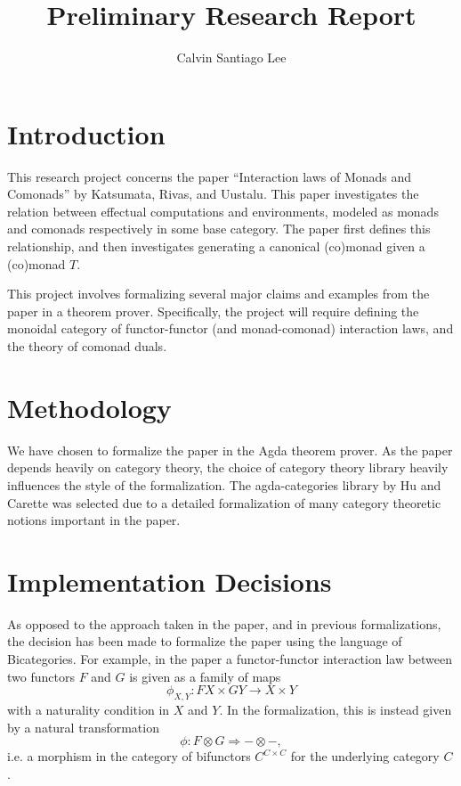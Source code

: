 \documentclass{amsart}
\title{Preliminary Research Report}
\author{Calvin Santiago Lee}
\theoremstyle{remark}
\begin{document}
\maketitle
\tableofcontents
\section{Introduction}

This research project concerns the paper ``Interaction laws of Monads and Comonads'' by Katsumata, Rivas, and Uustalu\cite{monads-comonads}. This paper investigates the relation between effectual computations  and environments, modeled as monads and comonads respectively in some base category. The paper first defines this relationship, and then investigates generating a canonical (co)monad given a (co)monad $T$.

This project involves formalizing several major claims and examples from the paper in a theorem prover. Specifically, the project will require defining the monoidal category of functor-functor (and monad-comonad) interaction laws, and the theory of comonad duals.

\section{Methodology}
We have chosen to formalize the paper in the Agda\cite{agda} theorem prover. As the paper depends heavily on category theory, the choice of category theory library heavily influences the style of the formalization. The agda-categories\cite{agda:categories} library by Hu and Carette was selected due to a detailed formalization of many category theoretic notions important in the paper.

\section{Implementation Decisions}
As opposed to the approach taken in the paper, and in previous formalizations, the decision has been made to formalize the paper using the language of Bicategories\cite{nlab:bicategory}. For example, in the paper a functor-functor interaction law between two functors $F$ and $G$ is given as a family of maps 
\[\phi_{X,Y}\colon F X \times GY \to X \times Y\]
with a naturality condition in $X$ and $Y$.
In the formalization, this is instead given by a natural transformation \[\phi \colon F \otimes G \Rightarrow -\otimes -,\]
i.e. a morphism in the category of bifunctors \(C^{C\times C}\) for the underlying category $C$.
\end{document}
